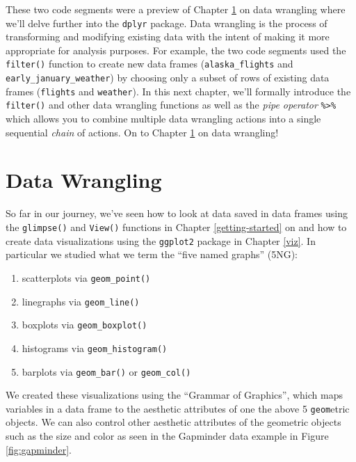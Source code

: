 \documentclass[12pt, krantz2,]{krantz}
\providecommand{\tightlist}{%
  \setlength{\itemsep}{0pt}\setlength{\parskip}{0pt}}
\begin{document}
These two code segments were a preview of Chapter \ref{wrangling} on data wrangling where we'll delve further into the \texttt{dplyr} package. Data wrangling is the process of transforming and modifying existing data with the intent of making it more appropriate for analysis purposes. For example, the two code segments used the \texttt{filter()} function to create new data frames (\texttt{alaska\_flights} and \texttt{early\_january\_weather}) by choosing only a subset of rows of existing data frames (\texttt{flights} and \texttt{weather}). In this next chapter, we'll formally introduce the \texttt{filter()} and other data wrangling functions as well as the \emph{pipe operator} \texttt{\%\textgreater{}\%} which allows you to combine multiple data wrangling actions into a single sequential \emph{chain} of actions. On to Chapter \ref{wrangling} on data wrangling!

\hypertarget{wrangling}{%
\chapter{Data Wrangling}\label{wrangling}}

So far in our journey, we've seen how to look at data saved in data frames using the \texttt{glimpse()} and \texttt{View()} functions in Chapter \ref{getting-started} on and how to create data visualizations using the \texttt{ggplot2} package in Chapter \ref{viz}. In particular we studied what we term the ``five named graphs'' (5NG):

\begin{enumerate}
\def\labelenumi{\arabic{enumi}.}
\tightlist
\item
  scatterplots via \texttt{geom\_point()}
\item
  linegraphs via \texttt{geom\_line()}
\item
  boxplots via \texttt{geom\_boxplot()}
\item
  histograms via \texttt{geom\_histogram()}
\item
  barplots via \texttt{geom\_bar()} or \texttt{geom\_col()}
\end{enumerate}

We created these visualizations using the ``Grammar of Graphics'', which maps variables in a data frame to the aesthetic attributes of one the above 5 \texttt{geom}etric objects. We can also control other aesthetic attributes of the geometric objects such as the size and color as seen in the Gapminder data example in Figure \ref{fig:gapminder}.
\end{document}
